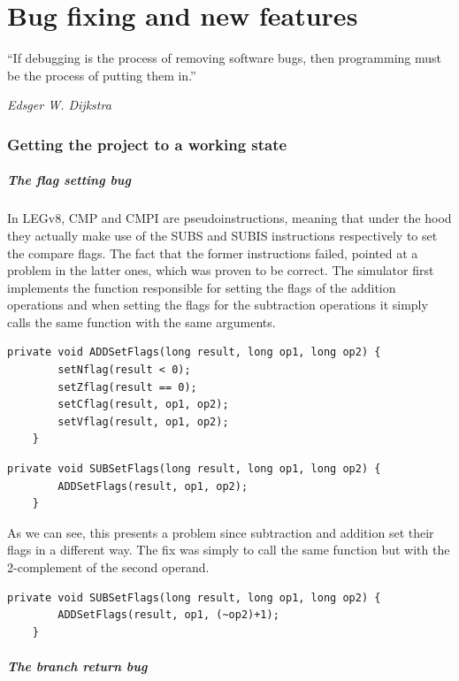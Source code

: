 \chapter{Bug fixing and new features}\label{chap:lipsum}

\epigraph{``If debugging is the process of removing software bugs, then programming must be the process of putting them in.''}{\textit{Edsger W. Dijkstra}}

\subsection*{Getting the project to a working state}

\paragraph*{The flag setting bug}

In LEGv8, CMP and CMPI are pseudoinstructions, meaning that under the hood they actually make use of the SUBS and SUBIS instructions respectively to set the compare flags. The fact that the former instructions failed, pointed at a problem in the latter ones, which was proven to be correct. The simulator first implements the function responsible for setting the flags of the addition operations and when setting the flags for the subtraction operations it simply calls the same function with the same arguments.
\begin{lstlisting}[caption={The adddition flag-setting code}]
	private void ADDSetFlags(long result, long op1, long op2) {
		setNflag(result < 0);
		setZflag(result == 0);
		setCflag(result, op1, op2);
		setVflag(result, op1, op2);
	}
\end{lstlisting}
\begin{lstlisting}[caption={The buggy subtraction flag-setting code}]
	private void SUBSetFlags(long result, long op1, long op2) {
		ADDSetFlags(result, op1, op2);
	}
\end{lstlisting}
As we can see, this presents a problem since subtraction and addition set their flags in a different way. The fix was simply to call the same function but with the 2-complement of the second operand.
\begin{lstlisting}[caption={The fixed subtraction flag-setting code}]
	private void SUBSetFlags(long result, long op1, long op2) {
		ADDSetFlags(result, op1, (~op2)+1);
	}
\end{lstlisting}

\paragraph*{The branch return bug}

